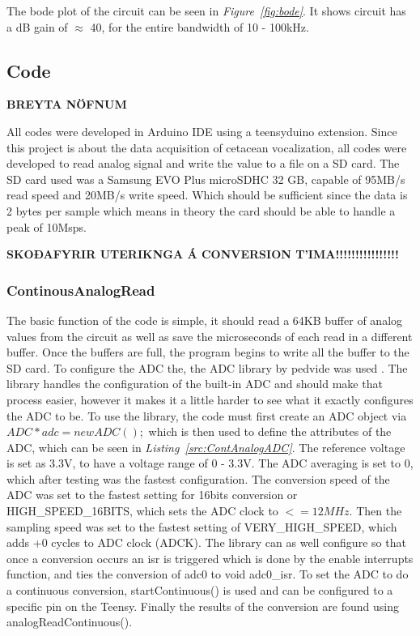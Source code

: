The bode plot of the circuit can be seen in \textit{Figure~\ref{fig:bode}}.
It shows  circuit has a dB gain of $\approx$ 40, for the entire bandwidth of 10 - 100kHz.



\clearpage
\subsection{Code}


\textbf{BREYTA NÖFNUM}


All codes were developed in Arduino IDE using a teensyduino extension.
Since this project is about the data acquisition of cetacean vocalization, all codes were developed to read analog signal and write the value to a file on a SD card.
The SD card used was a Samsung EVO Plus microSDHC 32 GB, capable of 95MB/s read speed and 20MB/s write speed.
Which should be sufficient since the data is 2 bytes per sample which means in theory the card should be able to handle a peak of 10Msps.



\textbf{SKOÐAFYRIR UTERIKNGA Á CONVERSION T'IMA!!!!!!!!!!!!!!!!}

\subsubsection{ContinousAnalogRead}

The basic function of the code is simple, it should read a 64KB buffer of  analog values from the circuit as well as save the microseconds of each read in a different buffer.
Once the buffers are full, the program begins to write all the buffer to the SD card.
To configure the ADC the, the ADC library by pedvide was used \cite{villanueva_pedvideadc_2021}.
The library handles the configuration of the built-in ADC and should make that process easier, however it makes it a little harder to see what it exactly configures the ADC to be.
To use the library, the code must first create an ADC object via 
$ADC *adc = new ADC();$
which is then used to define the attributes of the ADC, which can be seen in \textit{Listing~\ref{src:ContAnalogADC}}. 
The reference voltage is set as 3.3V, to have a voltage range of 0 - 3.3V.
The ADC averaging is set to 0, which after testing was the fastest configuration.
The conversion speed of the ADC was set to the fastest setting for 16bits conversion or HIGH\_SPEED\_16BITS, which sets the ADC clock to $<= 12 MHz$.
Then the sampling speed was set to the fastest setting of VERY\_HIGH\_SPEED, which adds +0 cycles to ADC clock (ADCK).
The library can as well configure so that once a conversion occurs an isr is triggered which is done by the enable interrupts function, and ties the conversion of adc0 to void adc0\_isr.
To set the ADC to do a continuous conversion, startContinuous() is used and can be configured to a specific pin on the Teensy.
Finally the results of the conversion are found using analogReadContinuous().

